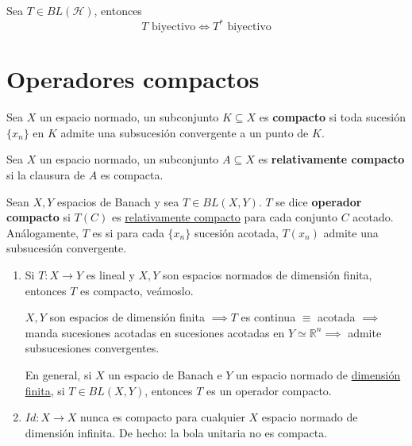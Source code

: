 \begin{prop}
    Sea $T\in BL(\mathcal{H})$, entonces 
    \begin{equation*}
        T \text{ biyectivo} \iff T^* \text{ biyectivo}
    \end{equation*} 
\end{prop}

\section{Operadores compactos}

\begin{definicion}
    Sea $X$ un espacio normado, un subconjunto $K \subseteq X$ es \textbf{compacto} si toda sucesión $\{x_n\}$ en $K$ admite una subsucesión convergente a un punto de $K$.
\end{definicion}

\begin{definicion}
    Sea $X$ un espacio normado, un subconjunto $A \subseteq X$ es \textbf{relativamente compacto} si la clausura de $A$ es compacta.
\end{definicion}

\begin{definicion}
    Sean $X, Y$ espacios de Banach y sea $T\in BL(X,Y)$. $T$ se dice \textbf{operador compacto} si $T(C)$ es \underline{relativamente compacto} para cada conjunto $C$ acotado. \\
    \noindent
    Análogamente, $T$ es  si para cada $\{x_n\}$ sucesión acotada, $T(x_n)$ admite una subsucesión convergente.
\end{definicion}


\begin{ejemplo}
    \begin{enumerate}
        \item Si $T: X \to Y$ es lineal y $X, Y$ son espacios normados de dimensión finita, entonces $T$ es compacto, veámoslo.
        
        $X, Y$ son espacios de dimensión finita $\implies T$ es continua 
        $\equiv$ acotada $\implies$ manda sucesiones acotadas en sucesiones acotadas en $Y \simeq \mathbb{R}^n \implies$ admite subsucesiones convergentes.
        
        En general, si $X$ un espacio de Banach e $Y$ un espacio normado de \underline{dimensión finita}, si $T \in BL(X, Y)$, entonces $T$ es un operador compacto.

        \item $Id: X \to X$ nunca es compacto para cualquier $X$ espacio normado de dimensión infinita. De hecho: la bola unitaria no es compacta.
    \end{enumerate}
\end{ejemplo}

